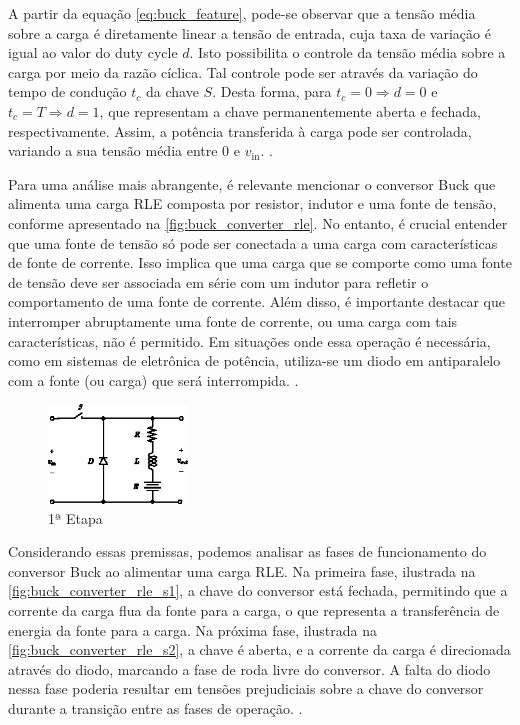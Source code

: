 A partir da equação \eqref{eq:buck_feature}, pode-se observar que a tensão média sobre a carga é diretamente linear a tensão de entrada, cuja taxa de variação é igual ao valor do duty cycle $d$. Isto possibilita o controle da tensão média sobre a carga por meio da razão cíclica. Tal controle pode ser através da variação do tempo de condução $t_c$ da chave $S$. Desta forma, para $t_c = 0 \Rightarrow d = 0$ e $t_c = T \Rightarrow d = 1$, que representam a chave permanentemente aberta e fechada, respectivamente. Assim, a potência transferida à carga pode ser controlada, variando a sua tensão média entre 0 e $v_{\mathrm{in}}$. \cite{martins2008}.

Para uma análise mais abrangente, é relevante mencionar o conversor Buck que alimenta uma carga RLE composta por resistor, indutor e uma fonte de tensão, conforme apresentado na \autoref{fig:buck_converter_rle}. No entanto, é crucial entender que uma fonte de tensão só pode ser conectada a uma carga com características de fonte de corrente. Isso implica que uma carga que se comporte como uma fonte de tensão deve ser associada em série com um indutor para refletir o comportamento de uma fonte de corrente. Além disso, é importante destacar que interromper abruptamente uma fonte de corrente, ou uma carga com tais características, não é permitido. Em situações onde essa operação é necessária, como em sistemas de eletrônica de potência, utiliza-se um diodo em antiparalelo com a fonte (ou carga) que será interrompida. \cite{martins2008}.

\begin{figure}[H]
  \centering
  \includegraphics[width=0.33\textwidth]{figuras/buck_converter_rle.eps}
  \caption{1ª Etapa}
  \label{fig:buck_converter_rle}
\end{figure}

Considerando essas premissas, podemos analisar as fases de funcionamento do conversor Buck ao alimentar uma carga RLE. Na primeira fase, ilustrada na \autoref{fig:buck_converter_rle_s1}, a chave do conversor está fechada, permitindo que a corrente da carga flua da fonte para a carga, o que representa a transferência de energia da fonte para a carga. Na próxima fase, ilustrada na \autoref{fig:buck_converter_rle_s2}, a chave é aberta, e a corrente da carga é direcionada através do diodo, marcando a fase de roda livre do conversor. A falta do diodo nessa fase poderia resultar em tensões prejudiciais sobre a chave do conversor durante a transição entre as fases de operação. \cite{martins2008}.

